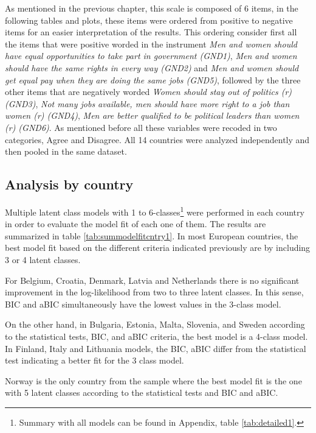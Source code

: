 \documentclass[12pt,a4paper,oneside]{reedthesis}
\begin{document}
As mentioned in the previous chapter, this scale is composed of 6 items, in the following tables and plots, these items were ordered from positive to negative items for an easier interpretation of the results. This ordering consider first all the items that were positive worded in the instrument \emph{Men and women should have equal opportunities to take part in government (GND1)}, \emph{Men and women should have the same rights in every way (GND2)} and \emph{Men and women should get equal pay when they are doing the same jobs (GND5)}, followed by the three other items that are negatively worded \emph{Women should stay out of politics (r) (GND3)}, \emph{Not many jobs available, men should have more right to a job than women (r) (GND4)}, \emph{Men are better qualified to be political leaders than women (r) (GND6)}. As mentioned before all these variables were recoded in two categories, Agree and Disagree. All 14 countries were analyzed independently and then pooled in the same dataset.

\hypertarget{analysis-by-country}{%
\subsection{Analysis by country}\label{analysis-by-country}}

Multiple latent class models with 1 to 6-classes\footnote{Summary with all models can be found in Appendix, table \ref{tab:detailed1}.} were performed in each country in order to evaluate the model fit of each one of them. The results are summarized in table \ref{tab:summodelfitcntry1}. In most European countries, the best model fit based on the different criteria indicated previously are by including 3 or 4 latent classes.

For Belgium, Croatia, Denmark, Latvia and Netherlands there is no significant improvement in the log-likelihood from two to three latent classes. In this sense, BIC and aBIC simultaneously have the lowest values in the 3-class model.

On the other hand, in Bulgaria, Estonia, Malta, Slovenia, and Sweden according to the statistical tests, BIC, and aBIC criteria, the best model is a 4-class model. In Finland, Italy and Lithuania models, the BIC, aBIC differ from the statistical test indicating a better fit for the 3 class model.

Norway is the only country from the sample where the best model fit is the one with 5 latent classes according to the statistical tests and BIC and aBIC.
\end{document}
